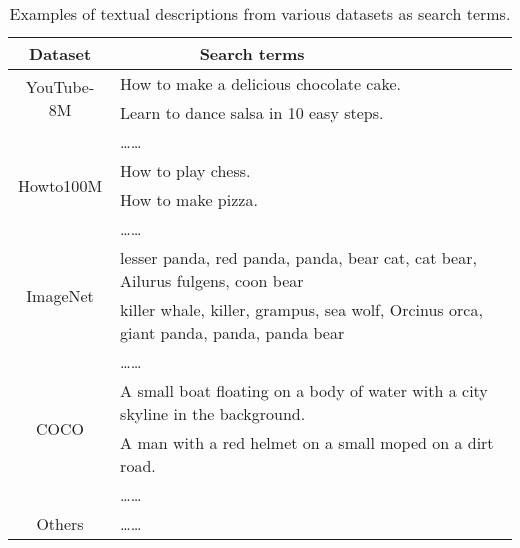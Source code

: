 \documentclass{article} \usepackage{iclr2024_conference,times}
\begin{document}
\begin{table*}[b]
\centering
\setlength\tabcolsep{1mm}
\renewcommand\arraystretch{1.1}
\caption{\label{table:text_data}Examples of textual descriptions from various datasets as search terms.}
\begin{tabular}{cllll}
\toprule

\multicolumn{1}{c}{\textbf{Dataset}}  & \multicolumn{1}{c}{\textbf{Search terms}}   \\ 

\toprule



\multicolumn{1}{c}{\multirow{2}{*}{YouTube-8M}}   & \multicolumn{4}{l}{How to make a delicious chocolate cake.} \\ 
\multicolumn{1}{c}{}                          & \multicolumn{4}{l}{Learn to dance salsa in 10 easy steps.}      \\
\multicolumn{1}{c}{}  & \multicolumn{4}{l}{\dots\dots}    \\ \hline

\multicolumn{1}{c}{\multirow{2}{*}{Howto100M}}   & \multicolumn{4}{l}{How to play chess.} \\ 
\multicolumn{1}{c}{}                          & \multicolumn{4}{l}{How to make pizza.}      \\
\multicolumn{1}{c}{}                  & \multicolumn{4}{l}{\dots\dots}    \\ \hline

\multicolumn{1}{c}{\multirow{2}{*}{ImageNet}} & \multicolumn{4}{l}{lesser panda, red panda, panda, bear cat, cat bear, Ailurus fulgens, coon bear}                       \\ 
\multicolumn{1}{c}{}                          & \multicolumn{4}{l}{killer whale, killer, grampus, sea wolf, Orcinus orca, giant panda, panda, panda bear}                               \\ 
\multicolumn{1}{c}{}                  & \multicolumn{4}{l}{\dots\dots}    \\ \hline


\multicolumn{1}{c}{\multirow{2}{*}{COCO}}     & \multicolumn{4}{l}{ A small boat floating on a body of water with a city skyline in the background.}                                                \\ 
\multicolumn{1}{c}{}                          & \multicolumn{4}{l}{A man with a red helmet on a small moped on a dirt road.}           \\ 
\multicolumn{1}{c}{}                          & \multicolumn{4}{l}{\dots\dots}                               \\ \hline



\multicolumn{1}{c}{\multirow{1}{*}{Others}}     & \multicolumn{4}{l}{\dots\dots}                                                \\ \hline


\toprule
\end{tabular}
\vspace{-0.4cm}
\end{table*}
\end{document}
